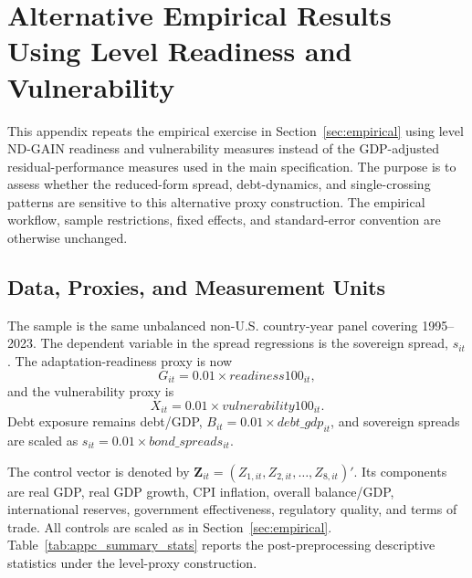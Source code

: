 \clearpage
\setcounter{table}{0}
\renewcommand{\thetable}{C.\arabic{table}}
\setcounter{figure}{0}
\renewcommand{\thefigure}{C.\arabic{figure}}
\setcounter{equation}{0}
\renewcommand{\theequation}{C.\arabic{equation}}

\section{Alternative Empirical Results Using Level Readiness and Vulnerability}
\label{appendixC}

This appendix repeats the empirical exercise in Section~\ref{sec:empirical} using level ND-GAIN readiness and vulnerability measures instead of the GDP-adjusted residual-performance measures used in the main specification. The purpose is to assess whether the reduced-form spread, debt-dynamics, and single-crossing patterns are sensitive to this alternative proxy construction. The empirical workflow, sample restrictions, fixed effects, and standard-error convention are otherwise unchanged.

\subsection{Data, Proxies, and Measurement Units}

The sample is the same unbalanced non-U.S. country-year panel covering 1995--2023. The dependent variable in the spread regressions is the sovereign spread, $s_{it}$. The adaptation-readiness proxy is now
\begin{equation}
G_{it}=0.01\times readiness100_{it},
\label{eq:appc_G_def}
\end{equation}
and the vulnerability proxy is
\begin{equation}
X_{it}=0.01\times vulnerability100_{it}.
\label{eq:appc_X_def}
\end{equation}
Debt exposure remains debt/GDP, $B_{it}=0.01\times debt\_gdp_{it}$, and sovereign spreads are scaled as $s_{it}=0.01\times bond\_spreads_{it}$.

The control vector is denoted by $\mathbf{Z}_{it}=(Z_{1,it},Z_{2,it},\ldots,Z_{8,it})'$. Its components are real GDP, real GDP growth, CPI inflation, overall balance/GDP, international reserves, government effectiveness, regulatory quality, and terms of trade. All controls are scaled as in Section~\ref{sec:empirical}. Table~\ref{tab:appc_summary_stats} reports the post-preprocessing descriptive statistics under the level-proxy construction.

